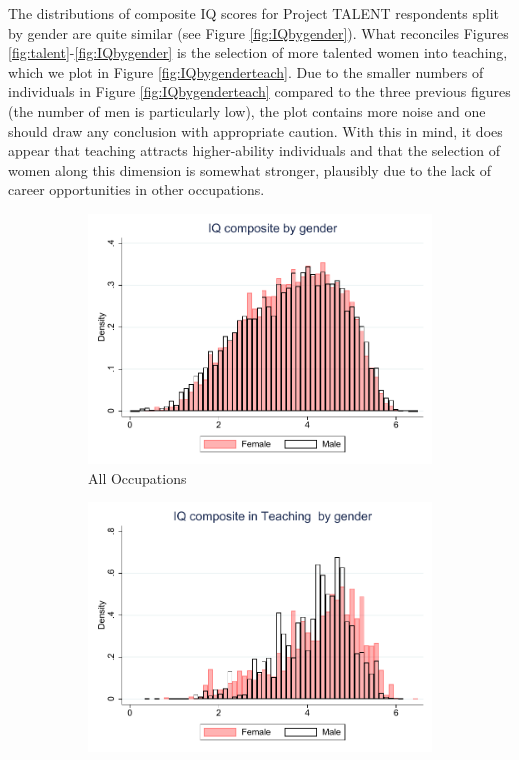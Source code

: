 \documentclass[onehalfspacing,11pt]{article}
\begin{document}
The distributions of composite IQ scores for Project TALENT respondents split by gender are quite similar (see Figure \ref{fig:IQbygender}). What reconciles Figures \ref{fig:talent}-\ref{fig:IQbygender} is the selection of more talented women into teaching, which we plot in Figure \ref{fig:IQbygenderteach}. Due to the smaller numbers of individuals in Figure \ref{fig:IQbygenderteach} compared to the three previous figures (the number of men is particularly low), the plot contains more noise and one should draw any conclusion with appropriate caution. With this in mind, it does appear that teaching attracts higher-ability individuals and that the selection of women along this dimension is somewhat stronger, plausibly due to the lack of career opportunities in other occupations.

\begin{figure}
	\begin{subfigure}{0.49\textwidth}
	\includegraphics[width=\linewidth]{TALENT_IQ_gender.pdf}
	\caption{All Occupations}
	\label{fig:IQbygenderall}
	\end{subfigure}	
	\hspace*{\fill} %
	\begin{subfigure}{0.49\textwidth}
	\includegraphics[width=\linewidth]{TALENT_IQ_gender_teacher.pdf}

\end{subfigure}
\end{figure}
\end{document}
